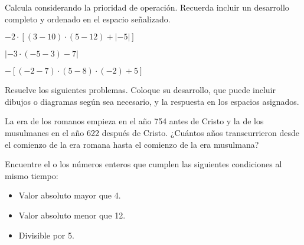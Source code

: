 \documentclass{prueba}
\begin{document}
\parte{} Calcula considerando la prioridad de operación. Recuerda incluir un desarrollo 
completo y ordenado en el espacio señalizado.

\pregunta{} $-2\cdot\left[\left(3-10\right)\cdot(5-12) + \left|-5\right|\right]$
\desarrollo[4.5cm]

\pregunta{} $\left|-3\cdot(-5-3) - 7\right|$
\desarrollo[4.5cm]

\pregunta{} $-\left[\left(-2-7\right)\cdot\left(5-8\right)\cdot\left(-2\right) + 5\right]$
\desarrollo[4.5cm]

\parte{} Resuelve los siguientes problemas. Coloque su desarrollo, que puede incluir dibujos o
diagramas según sea necesario, y la respuesta en los espacios asignados.

\pregunta{} La era de los romanos empieza en el año 754 antes de Cristo y la de los 
musulmanes en el año 622 después de Cristo. ¿Cuántos años transcurrieron desde el 
comienzo de la era romana hasta el comienzo de la era musulmana?
\desarrollo[4cm]
\respuesta

\pregunta{} Encuentre el o los números enteros que cumplen las siguientes condiciones
al mismo tiempo:
\begin{itemize}
    \item Valor absoluto mayor que 4.
    \item Valor absoluto menor que 12.
    \item Divisible por 5.
\end{itemize}
\desarrollo[4cm]
\respuesta
\end{document}
